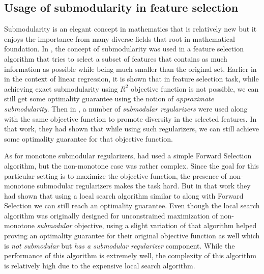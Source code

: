 \subsection{Usage of submodularity in feature selection}
Submodularity is an elegant concept in mathematics that is relatively new but it enjoys the importance from many diverse fields that root in mathematical foundation. In \citealp{liu-submodfeature2013-icassp}, the concept of submodularity was used in a feature selection algorithm that tries to select a subset of features that contains as much information as possible while being much smaller than the original set. Earlier in \citealp{DasDK11} in the context of linear regression, it is shown that in feature selection task, while achieving exact submodularity using $R^2$ objective function is not possible, we can still get some optimality guarantee using the notion of \emph{approximate submodularity}. Then in \citealp{NIPS2012_4689}, a number of \emph{submodular regularizers} were used along with the same objective function to promote diversity in the selected features. In that work, they had shown that while using such regularizers, we can still achieve some optimality guarantee for that objective function. 

As for monotone submodular regularizers, \citealp{NIPS2012_4689} had used a simple Forward Selection algorithm, but the non-monotone case was rather complex. Since the goal for this particular setting is to maximize the objective function, the presence of non-monotone submodular regularizers makes the task hard. But in that work they had shown that using a local search algorithm similar to \citealp{Feige:2011:MNS:2079073.2079078} along with Forward Selection we can still reach an optimality guarantee. Even though the local search algorithm was originally designed for unconstrained maximization of non-monotone \emph{submodular} objective, using a slight variation of that algorithm helped proving an optimality guarantee for their original objective function as well which is \emph{not submodular} but \emph{has a submodular regularizer} component. While the performance of this algorithm is extremely well, the complexity of this algorithm is relatively high due to the expensive local search algorithm. 

